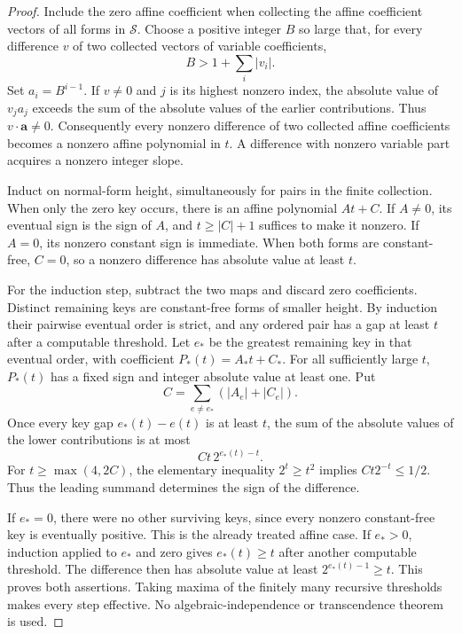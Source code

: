 \documentclass[11pt]{article}
\begin{document}
\begin{proof}
Include the zero affine coefficient when collecting the affine
coefficient vectors of all forms in $\mathcal S$.  Choose a positive
integer $B$ so large that, for every difference $v$ of two collected
vectors of variable coefficients,
\[
             B>1+\sum_i |v_i|.
\]
Set $a_i=B^{i-1}$.  If $v\ne0$ and $j$ is its highest nonzero index,
the absolute value of $v_ja_j$ exceeds the sum of the absolute values of
the earlier contributions.  Thus $v\cdot\mathbf a\ne0$.
Consequently every nonzero difference of two collected affine
coefficients becomes a nonzero affine polynomial in $t$.  A difference
with nonzero variable part acquires a nonzero integer slope.

Induct on normal-form height, simultaneously for pairs in the finite
collection.  When only the zero key occurs, there is an affine polynomial
$At+C$.  If $A\ne0$, its eventual sign is the sign of $A$, and
$t\ge |C|+1$ suffices to make it nonzero.  If $A=0$, its nonzero constant
sign is immediate.  When both forms are constant-free, $C=0$, so a
nonzero difference has absolute value at least $t$.

For the induction step, subtract the two maps and discard zero
coefficients.  Distinct remaining keys are constant-free forms of
smaller height.  By induction their pairwise eventual order is strict,
and any ordered pair has a gap at least $t$ after a computable threshold.
Let $e_*$ be the greatest remaining key in that eventual order, with
coefficient $P_*(t)=A_*t+C_*$.  For all sufficiently large $t$,
$P_*(t)$ has a fixed sign and integer absolute value at least one.
Put
\[
       C=\sum_{e\ne e_*} (|A_e|+|C_e|).
\]
Once every key gap $e_*(t)-e(t)$ is at least $t$, the sum of the absolute
values of the lower contributions is at most
\[
        C t\,2^{e_*(t)-t}.                              \tag{N3}
\]
For $t\ge\max(4,2C)$, the elementary inequality $2^t\ge t^2$
implies $Ct2^{-t}\le1/2$.  Thus the leading summand determines the
sign of the difference.

If $e_*=0$, there were no other surviving keys, since every nonzero
constant-free key is eventually positive.  This is the already treated
affine case.  If $e_*>0$, induction applied to
$e_*$ and zero gives $e_*(t)\ge t$ after another computable threshold.
The difference then has absolute value at least
$2^{e_*(t)-1}\ge t$.  This proves both assertions.  Taking maxima of
the finitely many recursive thresholds makes every step effective.
No algebraic-independence or transcendence theorem is used.
\end{proof}
\end{document}
